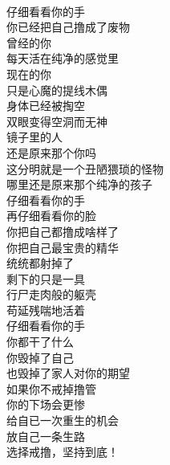 \begin{poem}[戒撸是金]
    \begin{multicols}{2}
        \begin{center}~\\
            仔细看看你的手 \\ 你已经把自己撸成了废物 \\ 曾经的你 \\ 每天活在纯净的感觉里 \\ 现在的你 \\ 只是心魔的提线木偶 \\ 身体已经被掏空 \\ 双眼变得空洞而无神 \\ 镜子里的人 \\ 还是原来那个你吗 \\ 这分明就是一个丑陋猥琐的怪物 \\ 哪里还是原来那个纯净的孩子 \\ 仔细看看你的手 \\ 再仔细看看你的脸 \\ 你把自己都撸成啥样了 \\ 你把自己最宝贵的精华 \\ 统统都射掉了 \\ 剩下的只是一具 \\ 行尸走肉般的躯壳 \\ 苟延残喘地活着 \\ 仔细看看你的手 \\ 你都干了什么 \\ 你毁掉了自己 \\ 也毁掉了家人对你的期望 \\ 如果你不戒掉撸管 \\ 你的下场会更惨 \\ 给自已一次重生的机会 \\ 放自己一条生路 \\ 选择戒撸，坚持到底！
        \end{center}
    \end{multicols}
\end{poem}
